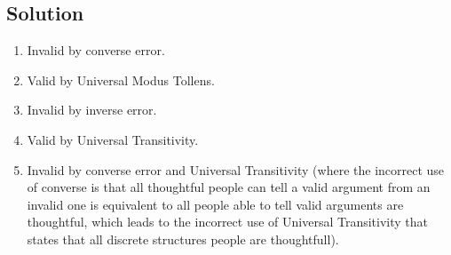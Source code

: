 \documentclass[table]{article}
\begin{document}
\subsection{Solution}
\begin{enumerate}[nosep, label=\alph*)]
\item Invalid by converse error.
\item Valid by Universal Modus Tollens.
\item Invalid by inverse error.
\item Valid by Universal Transitivity.
\item Invalid by converse error and Universal Transitivity (where the incorrect use of converse is that all thoughtful people can tell a valid argument from an invalid one is equivalent to all people able to tell valid arguments are thoughtful, which leads to the incorrect use of Universal Transitivity that states that all discrete structures people are thoughtfull).
\end{enumerate}
\end{document}
